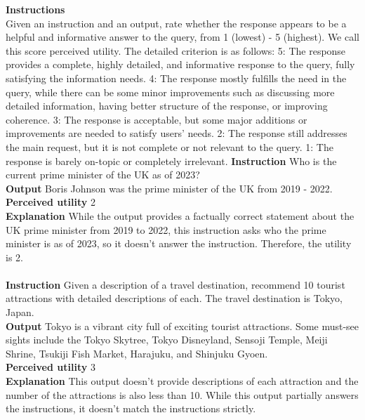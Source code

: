 \begin{table}[h!]
\begin{tcolorbox}
{\bf Instructions}\\ 
Given an instruction and an output, rate whether the response appears to be a helpful and informative answer to the query, from 1 (lowest) - 5 (highest). We call this score perceived utility. The detailed criterion is as follows: 
5: The response provides a complete, highly detailed, and informative response to the query, fully satisfying the information needs. 
4: The response mostly fulfills the need in the query, while there can be some minor improvements such as discussing more detailed information, having better structure of the response, or improving coherence.   
3: The response is acceptable, but some major additions or improvements are needed to satisfy users’ needs. 
2: The response still addresses the main request, but it is not complete or not relevant to the query. 
1: The response is barely on-topic or completely irrelevant. 
\tcblower
{\bf Instruction} Who is the current prime minister of the UK as of 2023? \\
{\bf Output} Boris Johnson was the prime minister of the UK from 2019 - 2022. \\
{\bf Perceived utility} 2 \\
{\bf Explanation} While the output provides a factually correct statement about the UK prime minister from 2019 to 2022, this instruction asks who the prime minister is as of 2023, so it doesn't answer the instruction. Therefore, the utility is 2. \\
\\
{\bf Instruction} Given a description of a travel destination, recommend 10 tourist attractions with detailed descriptions of each. The travel destination is Tokyo, Japan.\\
{\bf Output} 
Tokyo is a vibrant city full of exciting tourist attractions. Some must-see sights include the Tokyo Skytree, Tokyo Disneyland, Sensoji Temple, Meiji Shrine, Tsukiji Fish Market, Harajuku, and Shinjuku Gyoen. \\
{\bf Perceived utility} 3 \\
{\bf Explanation} This output doesn't provide descriptions of each attraction and the number of the attractions is also less than 10. While this output partially answers the instructions, it doesn't match the instructions strictly. 
\end{tcolorbox}
\caption{\label{tab:algo_box_use} Instructions and demonstrations for \cuse tokens. }
\end{table}
